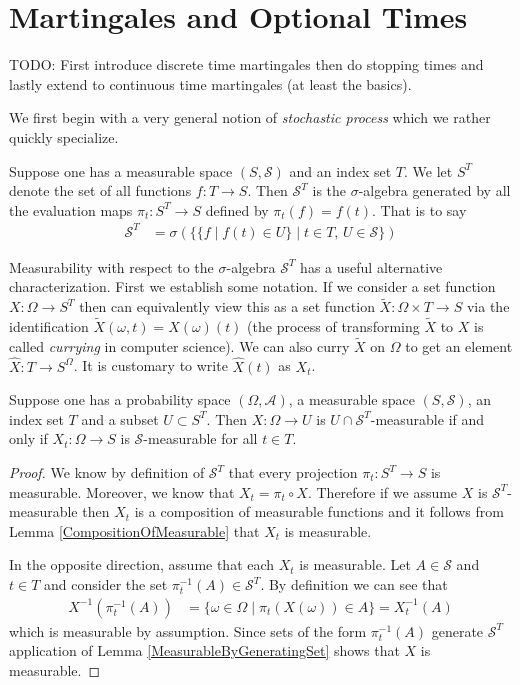 \section{Martingales and Optional Times}
TODO:  First introduce discrete time martingales then do stopping
times and lastly extend to continuous time martingales (at least the
basics).

We first begin with a very general notion of \emph{stochastic process}
which we rather quickly specialize.  
\begin{defn}Suppose one has a measurable space $(S, \mathcal{S})$ and an
  index set $T$.  We let $S^T$ denote the set of all functions $f : T
  \to S$.  Then $\mathcal{S}^T$ is the $\sigma$-algebra generated by
  all the evaluation maps $\pi_t : S^T \to S$ defined by $\pi_t(f) =
  f(t)$.  That is to say
\begin{align*}
\mathcal{S}^T &= \sigma \left ( \lbrace \lbrace f \mid f(t) \in U
  \rbrace \mid t \in T \text{, } U \in
  \mathcal{S} \rbrace\right )
\end{align*}
\end{defn}
Measurability with respect to the $\sigma$-algebra $\mathcal{S}^T$ has a useful
alternative characterization.  First we establish some notation.  If
we consider a set function $X : \Omega \to S^T$ then can equivalently
view this as a set function $\tilde{X} : \Omega \times T \to S$ via the
identification $\tilde{X}(\omega, t) = X(\omega)(t)$ (the process of
transforming $\tilde{X}$ to $X$  is called
\emph{currying} in computer science).  We can also curry $\tilde{X}$ on $\Omega$
 to get an element $\hat{X} : T \to S^\Omega$.  It is customary to
write $\hat{X}(t)$ as $X_t$.
\begin{lem}\label{ProcessMeasurableProjections}Suppose one has a probability space $(\Omega,
  \mathcal{A})$, a measurable space $(S, \mathcal{S})$, an
  index set $T$ and a subset $U \subset S^T$.  Then $X : \Omega \to U$
  is $U \cap \mathcal{S}^T$-measurable if and only if $X_t : \Omega
  \to S$ is $\mathcal{S}$-measurable for all $t \in T$.
\end{lem}
\begin{proof}
We know by definition of $\mathcal{S}^T$ that every projection $\pi_t
: S^T \to S$ is measurable.  Moreover, we know that $X_t = \pi_t \circ
X$.  Therefore if we assume $X$ is
$\mathcal{S}^T$-measurable then $X_t$ is a composition of measurable
functions and it follows from Lemma
\ref{CompositionOfMeasurable} that $X_t$ is measurable.

In the opposite direction, assume that each $X_t$ is measurable.  Let
$A \in \mathcal{S}$ and $t \in T$ and consider the set $\pi_t^{-1}(A)
\in \mathcal{S}^T$.  By definition we can see that
\begin{align*}
X^{-1}(\pi_t^{-1}(A)) &= \lbrace \omega \in \Omega \mid
\pi_t(X(\omega)) \in A \rbrace = X_t^{-1}(A)
\end{align*}
which is measurable by assumption.  Since sets of the form
$\pi_t^{-1}(A)$ generate $\mathcal{S}^T$ application of Lemma \ref{MeasurableByGeneratingSet}
shows that $X$ is measurable.
\end{proof}

